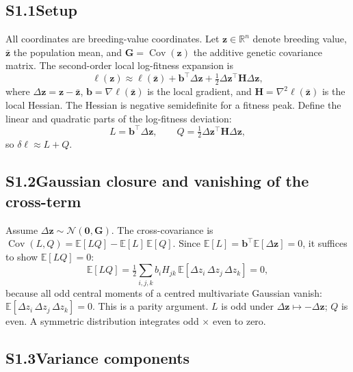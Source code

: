 \documentclass[11pt]{article}
\newcommand{\vect}[1]{\boldsymbol{#1}}
\newcommand{\mat}[1]{\mathbf{#1}}
\newcommand{\Cov}{\operatorname{Cov}}
\begin{document}
\subsection*{S1.1\quad Setup}

All coordinates are breeding-value coordinates.
Let $\vect{z}\in\mathbb{R}^n$ denote breeding value,
$\bar{\vect{z}}$ the population mean, and
$\mat{G} = \Cov(\vect{z})$ the additive genetic covariance matrix.
The second-order local log-fitness expansion is
\begin{equation}
\ell(\vect{z})
\approx \ell(\bar{\vect{z}})
+ \vect{b}^\top\!\Delta\vect{z}
+ \tfrac{1}{2}\Delta\vect{z}^\top\mat{H}\Delta\vect{z},
\label{eq:S1_taylor}
\end{equation}
where $\Delta\vect{z} = \vect{z} - \bar{\vect{z}}$,
$\vect{b} = \nabla\ell(\bar{\vect{z}})$ is the local gradient,
and $\mat{H} = \nabla^2\ell(\bar{\vect{z}})$ is the local Hessian.
The Hessian is negative semidefinite for a fitness peak.
Define the linear and quadratic parts of the log-fitness deviation:
\begin{equation}
L = \vect{b}^\top\Delta\vect{z},
\qquad
Q = \tfrac{1}{2}\Delta\vect{z}^\top\mat{H}\Delta\vect{z},
\label{eq:S1_LQ}
\end{equation}
so $\delta\ell \approx L + Q$.

\subsection*{S1.2\quad Gaussian closure and vanishing of the
             cross-term}

Assume $\Delta\vect{z} \sim \mathcal{N}(\vect{0},\mat{G})$.
The cross-covariance is
$\Cov(L,Q) = \mathbb{E}[LQ] - \mathbb{E}[L]\,\mathbb{E}[Q]$.
Since $\mathbb{E}[L] = \vect{b}^\top\mathbb{E}[\Delta\vect{z}] = 0$,
it suffices to show $\mathbb{E}[LQ] = 0$:
\begin{equation}
\mathbb{E}[LQ]
= \tfrac{1}{2}\sum_{i,j,k}
  b_i H_{jk}\,
  \mathbb{E}[\Delta z_i\,\Delta z_j\,\Delta z_k] = 0,
\label{eq:S1_cross}
\end{equation}
because all odd central moments of a centred multivariate Gaussian
vanish: $\mathbb{E}[\Delta z_i\,\Delta z_j\,\Delta z_k] = 0$.
This is a parity argument.
$L$ is odd under
$\Delta\vect{z}\mapsto-\Delta\vect{z}$; $Q$ is even.
A symmetric distribution integrates odd $\times$ even to zero.

\subsection*{S1.3\quad Variance components}
\end{document}

